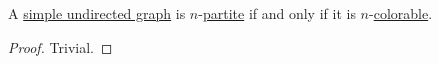 \begin{proposition}\label{thm:n_colorable_iff_n_partite}
  A \hyperref[def:undirected_graph]{simple undirected graph} is \( n \)-\hyperref[def:n_partite_graph]{partite} if and only if it is \( n \)-\hyperref[def:graph_coloring/colorable]{colorable}.
\end{proposition}
\begin{proof}
  Trivial.
\end{proof}
